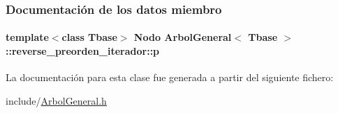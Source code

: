 \subsubsection{Documentación de los datos miembro}
\paragraph[{\texorpdfstring{p}{p}}]{\setlength{\rightskip}{0pt plus 5cm}template$<$class Tbase$>$ {\bf Nodo} {\bf Arbol\+General}$<$ Tbase $>$\+::reverse\+\_\+preorden\+\_\+iterador\+::p\hspace{0.3cm}{\ttfamily [private]}}\hypertarget{classArbolGeneral_1_1reverse__preorden__iterador_a002862fdee453a84b037e5dd26c071a2}{}\label{classArbolGeneral_1_1reverse__preorden__iterador_a002862fdee453a84b037e5dd26c071a2}


La documentación para esta clase fue generada a partir del siguiente fichero\+:\begin{DoxyCompactItemize}
\item 
include/\hyperlink{ArbolGeneral_8h}{Arbol\+General.\+h}\end{DoxyCompactItemize}
